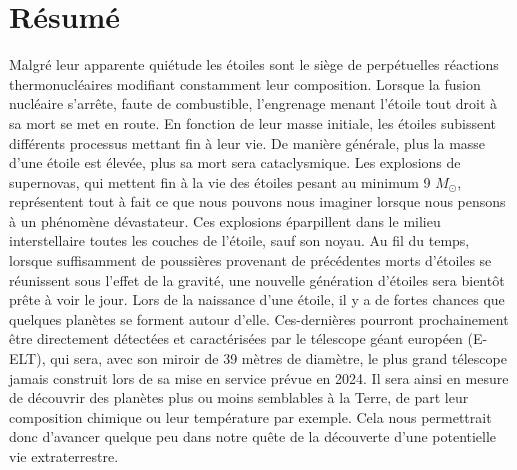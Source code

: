 
\chapter*{Résumé}
\thispagestyle{empty}

\vfill


Malgré leur apparente quiétude les étoiles sont le siège de perpétuelles réactions thermonucléaires modifiant constamment leur composition. Lorsque la fusion nucléaire s'arrête, faute de combustible, l'engrenage menant l'étoile tout droit à sa mort se met en route. En fonction de leur masse initiale, les étoiles subissent différents processus mettant fin à leur vie. De manière générale, plus la masse d'une étoile est élevée, plus sa mort sera cataclysmique. Les explosions de supernovas, qui mettent fin à la vie des étoiles pesant au minimum 9  $M_\odot$, représentent tout à fait ce que nous pouvons nous imaginer lorsque nous pensons à un phénomène dévastateur. Ces explosions éparpillent dans le milieu interstellaire toutes les couches de l'étoile, sauf son noyau. Au fil du temps, lorsque suffisamment de poussières provenant de précédentes morts d'étoiles se réunissent sous l'effet de la gravité, une nouvelle génération d'étoiles sera bientôt prête à voir le jour. Lors de la naissance d'une étoile, il y a de fortes chances que quelques planètes se forment autour d'elle. Ces-dernières pourront prochainement être directement détectées et caractérisées par le télescope géant européen (E-ELT), qui sera, avec son miroir de 39  mètres de diamètre, le plus grand télescope jamais construit lors de sa mise en service prévue en 2024. Il sera ainsi en mesure de découvrir des planètes plus ou moins semblables à la Terre, de part leur composition chimique ou leur température par exemple. Cela nous permettrait donc d'avancer quelque peu dans notre quête de la découverte d'une potentielle vie extraterrestre.



\vfill



